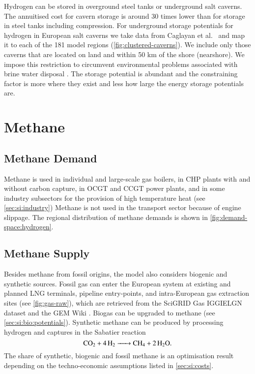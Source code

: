 Hydrogen can be stored in overground steel tanks or underground salt caverns.
The annuitised cost for cavern storage is around 30 times lower than for storage
in steel tanks including compression. For underground storage potentials for
hydrogen in European salt caverns we take data from Caglayan et
al.~ and map it to
each of the 181 model regions (\cref{fig:clustered-caverns}). We include only
those caverns that are located on land and within 50 km of the shore
(nearshore). We impose this restriction to circumvent environmental problems
associated with brine water disposal . The
storage potential is abundant and the constraining factor is more where they
exist and less how large the energy storage potentials are.

\section{Methane}
\label{sec:si:methane}

\subsection{Methane Demand}
\label{sec:si:methane:demand}

Methane is used in individual and large-scale gas boilers, in CHP plants with
and without carbon capture, in OCGT and CCGT power plants, and in some industry
subsectors for the provision of high temperature heat (see
\cref{sec:si:industry}) Methane is not used in the transport sector because of
engine slippage. The regional distribution of methane demands is shown in
\cref{fig:demand-space:hydrogen}.

\subsection{Methane Supply}
\label{sec:si:methane:supply}

Besides methane from fossil origins, the model also considers biogenic and
synthetic sources. Fossil gas can enter the European system at existing and
planned LNG terminals, pipeline entry-points, and intra-European gas extraction
sites (see \cref{fig:gas-raw}), which are retrieved from the SciGRID Gas
IGGIELGN dataset and the GEM
Wiki . Biogas can be upgraded to methane (see
\cref{sec:si:bio:potentials}). Synthetic methane can be produced by processing
hydrogen and captures \co in the Sabatier reaction
\begin{equation}
    \ce{CO2 + 4H2 -> CH4 + 2H2O}.
\end{equation}
The share of synthetic, biogenic and fossil methane is an optimisation result
depending on the techno-economic assumptions listed in \cref{sec:si:costs}.

